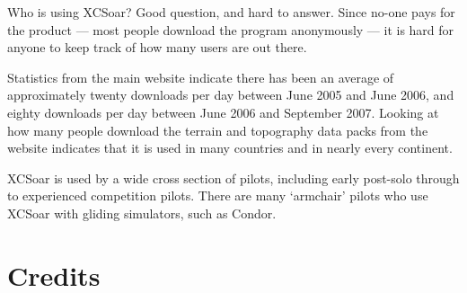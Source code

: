 Who is using XCSoar?  Good question, and hard to answer.  Since no-one
pays for the product --- most people download the program anonymously
--- it is hard for anyone to keep track of how many users are out
there.

Statistics from the main website indicate there has been an average of
approximately twenty downloads per day between June 2005 and June
2006, and eighty downloads per day between June 2006 and September
2007.  Looking at how many people download the terrain and topography
data packs from the website indicates that it is used in many
countries and in nearly every continent.

XCSoar is used by a wide cross section of pilots, including early
post-solo through to experienced competition pilots.  There are many
`armchair' pilots who use XCSoar with gliding simulators, such as
Condor.

\section{Credits}\label{sec:credits}

